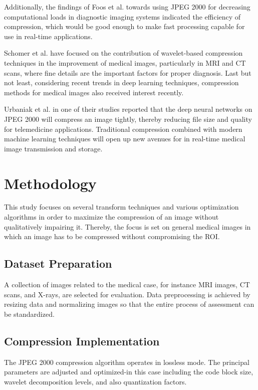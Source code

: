 \documentclass[conference,letterpaper]{IEEEtran}
\begin{document}
Additionally, the findings of Foos et al. \cite{b7} towards using JPEG 2000 for decreasing computational loads in diagnostic imaging systems indicated the efficiency of compression, which would be good enough to make fast processing capable for use in real-time applications.

Schomer et al. \cite{b8} have focused on the contribution of wavelet-based compression techniques in the improvement of medical images, particularly in MRI and CT scans, where fine details are the important factors for proper diagnosis. Last but not least, considering recent trends in deep learning techniques, compression methods for medical images also received interest recently.

Urbaniak et al. \cite{b9} in one of their studies reported that the deep neural networks on JPEG 2000 will compress an image tightly, thereby reducing file size and quality for telemedicine applications. Traditional compression combined with modern machine learning techniques will open up new avenues for in real-time medical image transmission and storage. 

\section{Methodology}
This study focuses on several transform techniques and various optimization algorithms in order to maximize the compression of an image without qualitatively impairing it. Thereby, the focus is set on general medical images in which an image has to be compressed without compromising the ROI.

\subsection{Dataset Preparation}
A collection of images related to the medical case, for instance MRI images, CT scans, and X-rays, are selected for evaluation. Data preprocessing is achieved by resizing data and normalizing images so that the entire process of assessment can be standardized.

\subsection{Compression Implementation}
The JPEG 2000 compression algorithm operates in lossless mode. The principal parameters are adjusted and optimized-in this case including the code block size, wavelet decomposition levels, and also quantization factors.
\end{document}
